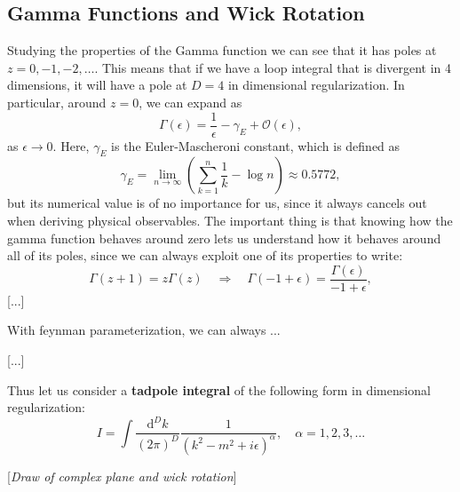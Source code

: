 \subsection{Gamma Functions and Wick Rotation}

Studying the properties of the Gamma function we can see that it has poles at \(z = 0, -1, -2, \dots\). This means that if we have a loop integral that is divergent in 4 dimensions, it will have a pole at \(D=4\) in dimensional regularization. In particular, around \(z=0\), we can expand as
\[
    \Gamma(\epsilon) = \frac{1}{\epsilon} - \gamma_E + \mathcal{O}(\epsilon),
\]
as \(\epsilon \to 0\). Here, \(\gamma_E\) is the Euler-Mascheroni constant, which is defined as
\[
    \gamma_E = \lim_{n \to \infty} \left( \sum_{k=1}^n \frac{1}{k} - \log n\right) \approx 0.5772,
\]
but its numerical value is of no importance for us, since it always cancels out when deriving physical observables. The important thing is that knowing how the gamma function behaves around zero lets us understand how it behaves around all of its poles, since we can always exploit one of its properties to write:
\[
    \Gamma(z+1) = z \Gamma(z) \quad \Rightarrow \quad \Gamma(-1 + \epsilon) = \frac{\Gamma(\epsilon)}{-1 + \epsilon},
\]
[...]

With feynman parameterization, we can always ...

    [...]

Thus let us consider a \textbf{tadpole integral} of the following form in dimensional regularization:
\[
    I = \int \frac{\mathrm{d}^D k}{(2\pi)^D} \frac{1}{(k^2 - m^2 + i \epsilon)^{\alpha}}, \quad \alpha = 1,2,3,\dots
\]

[\textit{Draw of complex plane and wick rotation}]

